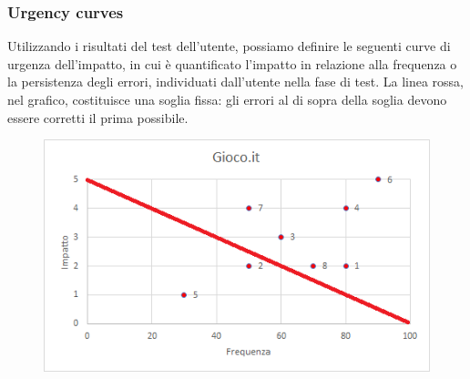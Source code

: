 \documentclass[../Report.tex]{subfiles}
\begin{document}
    \subsubsection{Urgency curves}
    Utilizzando i risultati del test dell'utente, possiamo definire le seguenti curve di urgenza dell'impatto, in cui è quantificato l’impatto in relazione alla frequenza o la persistenza degli errori, individuati dall'utente nella fase di test. La linea rossa, nel grafico, costituisce una soglia fissa: gli errori al di sopra della soglia devono essere corretti il prima possibile.     
    \begin{figure}[H]
        \includegraphics[width=\linewidth]{UrgencyCurve.png}
        \centering
    \end{figure}
\end{document}
